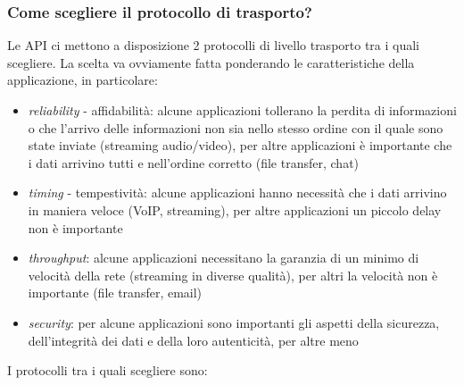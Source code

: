 \subsubsection{Come scegliere il protocollo di trasporto?}
Le API ci mettono a disposizione 2 protocolli di livello trasporto tra i quali scegliere.
La scelta va ovviamente fatta ponderando le caratteristiche della applicazione, in particolare:
\begin{itemize}
    \item \emph{reliability} - affidabilità: alcune applicazioni tollerano la perdita di informazioni o che l'arrivo delle informazioni non sia nello stesso ordine con il quale sono state inviate (streaming audio/video), per altre applicazioni è importante che i dati arrivino tutti e nell'ordine corretto (file transfer, chat)

    \item \emph{timing} - tempestività: alcune applicazioni hanno necessità che i dati arrivino in maniera veloce (VoIP, streaming), per altre applicazioni un piccolo delay non è importante
    
    \item \emph{throughput}: alcune applicazioni necessitano la garanzia di un minimo di velocità della rete (streaming in diverse qualità), per altri la velocità non è importante (file transfer, email)
    
    \item \emph{security}: per alcune applicazioni sono importanti gli aspetti della sicurezza, dell'integrità dei dati e della loro autenticità, per altre meno
\end{itemize}
I protocolli tra i quali scegliere sono:
